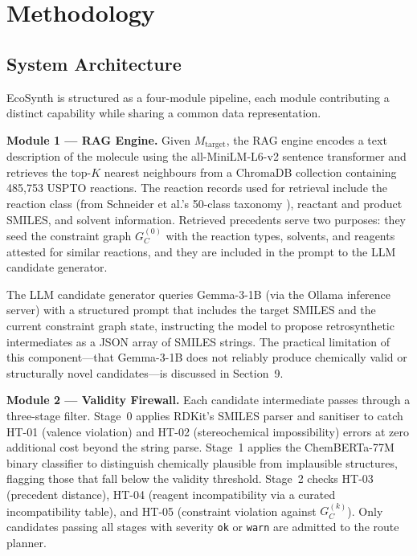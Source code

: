 \documentclass[12pt,a4paper]{article}
\begin{document}
\section{Methodology}

\subsection{System Architecture}

EcoSynth is structured as a four-module pipeline, each module contributing a
distinct capability while sharing a common data representation.

\textbf{Module 1 — RAG Engine.}
Given $M_{\text{target}}$, the RAG engine encodes a text description of the
molecule using the all-MiniLM-L6-v2 sentence transformer and retrieves the
top-$K$ nearest neighbours from a ChromaDB collection containing 485{,}753
USPTO reactions. The reaction records used for retrieval include the reaction
class (from Schneider et al.'s 50-class taxonomy \cite{schneider2016classification}),
reactant and product SMILES, and solvent information. Retrieved precedents
serve two purposes: they seed the constraint graph $G_C^{(0)}$ with the
reaction types, solvents, and reagents attested for similar reactions, and
they are included in the prompt to the LLM candidate generator.

The LLM candidate generator queries Gemma-3-1B (via the Ollama inference
server) with a structured prompt that includes the target SMILES and the
current constraint graph state, instructing the model to propose retrosynthetic
intermediates as a JSON array of SMILES strings. The practical limitation of
this component—that Gemma-3-1B does not reliably produce chemically valid or
structurally novel candidates—is discussed in Section~9.

\textbf{Module 2 — Validity Firewall.}
Each candidate intermediate passes through a three-stage filter. Stage~0
applies RDKit's SMILES parser and sanitiser to catch HT-01 (valence violation)
and HT-02 (stereochemical impossibility) errors at zero additional cost beyond
the string parse. Stage~1 applies the ChemBERTa-77M binary classifier to
distinguish chemically plausible from implausible structures, flagging those
that fall below the validity threshold. Stage~2 checks HT-03 (precedent
distance), HT-04 (reagent incompatibility via a curated incompatibility table),
and HT-05 (constraint violation against $G_C^{(k)}$). Only candidates
passing all stages with severity \texttt{ok} or \texttt{warn} are admitted to
the route planner.
\end{document}
